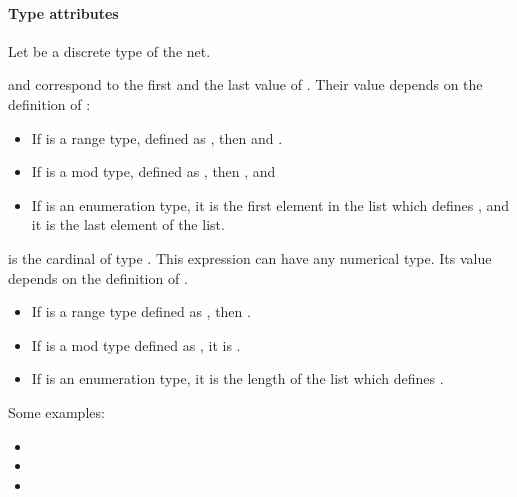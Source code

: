 \paragraph{Type attributes}
Let  be a discrete type of the net.
\begin{description}
\item
   and  correspond to the first and the last value of
  .
  Their value depends on the definition of :
  \begin{itemize}
  \item
    If  is a range type, defined as
    , then  and
    .
  \item
    If  is a mod type, defined as , then
    , and 
  \item
    If  is an enumeration type,  it is the first
    element in the list which defines , and  it
    is the last element of the list.
  \end{itemize}
\item
   is the cardinal of type .
  This expression can have any numerical type.
  Its value depends on the definition of .
  \begin{itemize}
  \item
    If  is a range type defined as ,
    then .
  \item
    If  is a mod type defined as , it is
    .
  \item
    If  is an enumeration type, it is the length of the list which
    defines .
  \end{itemize}
\end{description}
Some examples:
\begin{itemize}
\item
\item
\item
\end{itemize}

